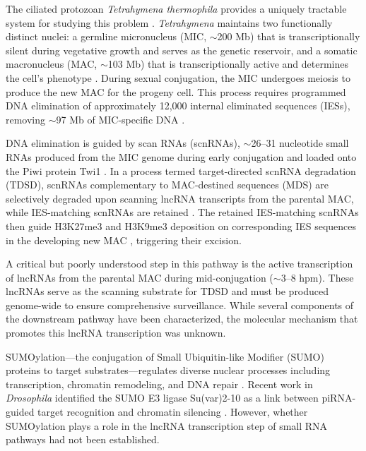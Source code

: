 \documentclass[11pt]{article}
\begin{document}
The ciliated protozoan \textit{Tetrahymena thermophila} provides a uniquely tractable system for studying this problem \citep{chalker2013dna, kataoka2010twi1}. \textit{Tetrahymena} maintains two functionally distinct nuclei: a germline micronucleus (MIC, $\sim$200 Mb) that is transcriptionally silent during vegetative growth and serves as the genetic reservoir, and a somatic macronucleus (MAC, $\sim$103 Mb) that is transcriptionally active and determines the cell's phenotype \citep{eisen2006macronuclear}. During sexual conjugation, the MIC undergoes meiosis to produce the new MAC for the progeny cell. This process requires programmed DNA elimination of approximately 12,000 internal eliminated sequences (IESs), removing $\sim$97 Mb of MIC-specific DNA \citep{yao2003dna, chalker2005epigenetics}.

DNA elimination is guided by scan RNAs (scnRNAs), $\sim$26--31 nucleotide small RNAs produced from the MIC genome during early conjugation and loaded onto the Piwi protein Twi1 \citep{mochizuki2002analysis, mochizuki2004conjugation}. In a process termed target-directed scnRNA degradation (TDSD), scnRNAs complementary to MAC-destined sequences (MDS) are selectively degraded upon scanning lncRNA transcripts from the parental MAC, while IES-matching scnRNAs are retained \citep{aronica2008studying, schoeberl2012twi1, noto2015small}. The retained IES-matching scnRNAs then guide H3K27me3 and H3K9me3 deposition on corresponding IES sequences in the developing new MAC \citep{liu2007rnapii}, triggering their excision.

A critical but poorly understood step in this pathway is the active transcription of lncRNAs from the parental MAC during mid-conjugation ($\sim$3--8 hpm). These lncRNAs serve as the scanning substrate for TDSD and must be produced genome-wide to ensure comprehensive surveillance. While several components of the downstream pathway have been characterized, the molecular mechanism that promotes this lncRNA transcription was unknown.

SUMOylation---the conjugation of Small Ubiquitin-like Modifier (SUMO) proteins to target substrates---regulates diverse nuclear processes including transcription, chromatin remodeling, and DNA repair \citep{johnson2005role, gareau2010sumo}. Recent work in \textit{Drosophila} identified the SUMO E3 ligase Su(var)2-10 as a link between piRNA-guided target recognition and chromatin silencing \citep{ninova2020suvar}. However, whether SUMOylation plays a role in the lncRNA transcription step of small RNA pathways had not been established.
\end{document}
